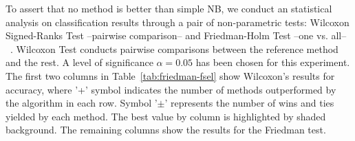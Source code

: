 \documentclass[preprint,12pt]{elsarticle}
\begin{document}
To assert that no method is better than simple NB, we conduct an statistical analysis on classification results through a pair of non-parametric tests: Wilcoxon Signed-Ranks Test --pairwise comparison-- and Friedman-Holm Test --one vs. all--~\cite{garcia09, derrac11}. Wilcoxon Test conducts pairwise comparisons between the reference method and the rest. A level of significance $\alpha = 0.05$ has been chosen for this experiment. The first two columns in Table~\ref{tab:friedman-fsel} show Wilcoxon's results for accuracy, where '+' symbol indicates the number of methods outperformed by the algorithm in each row. Symbol '$\pm$' represents the number of wins and ties yielded by each method. The best value by column is highlighted by shaded background. The remaining columns show the results for the Friedman test. 




\begin{table}[!htp]
\renewcommand{\arraystretch}{1.3}
\centering
\scriptsize
\caption{Wilcoxon test results and average rankings of methods (Friedman Procedure \& Adjusted p-value with Holm's Test) for accuracy}
\label{tab:friedman-fsel}
\end{table}
\end{document}
